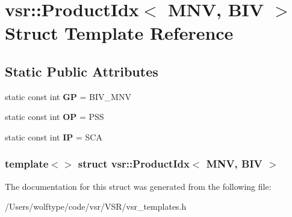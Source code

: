 \hypertarget{structvsr_1_1_product_idx_3_01_m_n_v_00_01_b_i_v_01_4}{\section{vsr\-:\-:Product\-Idx$<$ M\-N\-V, B\-I\-V $>$ Struct Template Reference}
\label{structvsr_1_1_product_idx_3_01_m_n_v_00_01_b_i_v_01_4}
}
\subsection*{Static Public Attributes}
\begin{DoxyCompactItemize}
\item 
\hypertarget{structvsr_1_1_product_idx_3_01_m_n_v_00_01_b_i_v_01_4_a24a8e8300cb4ca4f63efd5cffca75990}{static const int {\bfseries G\-P} = B\-I\-V\-\_\-\-M\-N\-V}\label{structvsr_1_1_product_idx_3_01_m_n_v_00_01_b_i_v_01_4_a24a8e8300cb4ca4f63efd5cffca75990}

\item 
\hypertarget{structvsr_1_1_product_idx_3_01_m_n_v_00_01_b_i_v_01_4_a86915a1a422108e6d67513ae4f5493b8}{static const int {\bfseries O\-P} = P\-S\-S}\label{structvsr_1_1_product_idx_3_01_m_n_v_00_01_b_i_v_01_4_a86915a1a422108e6d67513ae4f5493b8}

\item 
\hypertarget{structvsr_1_1_product_idx_3_01_m_n_v_00_01_b_i_v_01_4_af6920eb6630828223dfd1da304ee529e}{static const int {\bfseries I\-P} = S\-C\-A}\label{structvsr_1_1_product_idx_3_01_m_n_v_00_01_b_i_v_01_4_af6920eb6630828223dfd1da304ee529e}

\end{DoxyCompactItemize}
\subsubsection*{template$<$$>$ struct vsr\-::\-Product\-Idx$<$ M\-N\-V, B\-I\-V $>$}



The documentation for this struct was generated from the following file\-:\begin{DoxyCompactItemize}
\item 
/\-Users/wolftype/code/vsr/\-V\-S\-R/vsr\-\_\-templates.\-h\end{DoxyCompactItemize}
